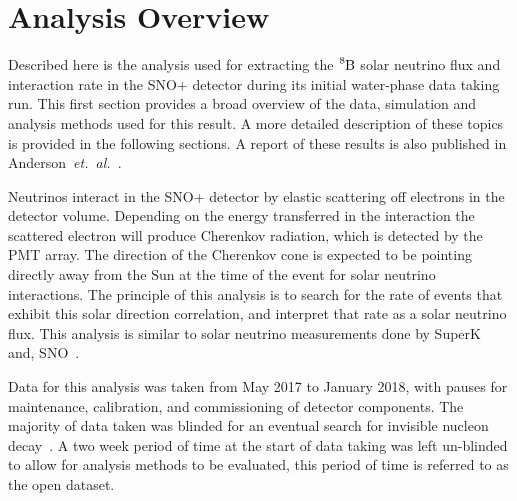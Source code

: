 
\chapter{Analysis Overview}
\label{ch:overview}
\ifpdf
    \graphicspath{{introduction/figures/PNG/}{introduction/figures/PDF/}{introduction/figures/}}
\else
    \graphicspath{{introduction/figures/EPS/}{introduction/figures/}}
\fi

 Described here is the analysis used for extracting the $\ce{^{8}B}$ solar
 neutrino flux and interaction rate in the SNO+ detector during its initial
 water-phase data taking run.
This first section provides a broad overview of the data, simulation and analysis methods
used for this result.
A more detailed description of these topics is provided in the following sections.
A report of these results is also published in Anderson~\textit{et.\ al.}~\cite{snop_solar}.

Neutrinos interact in the SNO+ detector by elastic scattering off
electrons in the detector volume.
Depending on the energy transferred in the interaction
the scattered electron will produce Cherenkov radiation, which is detected by the PMT array.
The direction of the Cherenkov cone is expected to be pointing directly away
from the Sun at the time of the event for solar neutrino interactions.
The principle of this analysis is to search for the rate of events that exhibit
this solar direction correlation, and interpret that rate as a solar neutrino flux.
This analysis is similar to solar neutrino measurements done by SuperK~\cite{superk4} and, SNO~\cite{sno_combined}.

Data for this analysis was taken from May 2017 to January 2018, with pauses
for maintenance, calibration, and commissioning of detector components.
The majority of data taken was blinded for an eventual search for invisible
nucleon decay~\cite{snop_nd}.
A two week period of time at the start of data taking was left un-blinded to
allow for analysis methods to be evaluated, this period of time is referred
to as the open dataset.

